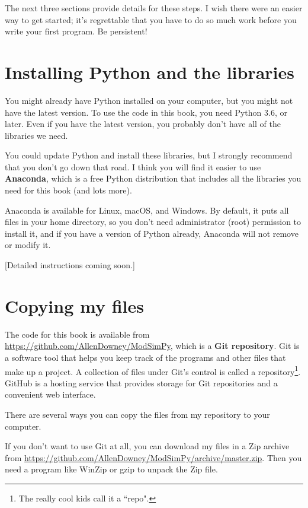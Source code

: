 \documentclass[12pt]{book}
\theoremstyle{exercise}
\begin{document}
The next three sections provide details for these steps.  I wish there were an easier way to get started; it's regrettable that you have to do so much work before you write your first program.  Be persistent!


\section{Installing Python and the libraries}

You might already have Python installed on your computer, but you might not have the latest version.  To use the code in this book, you need Python 3.6, or later.  Even if you have the latest version, you probably don't have all of the libraries we need.

You could update Python and install these libraries, but I strongly recommend that you don't go down that road.  I think you will find it easier to use {\bf Anaconda}, which is a free Python distribution that includes all the libraries you need for this book (and lots more).

Anaconda is available for Linux, macOS, and Windows.  By default, it puts all files in your home directory, so you don't need administrator (root) permission to install it, and if you have a version of Python already, Anaconda will not remove or modify it.

[Detailed instructions coming soon.]



\section{Copying my files}

The code for this book is available from
\url{https://github.com/AllenDowney/ModSimPy}, which is a {\bf Git repository}.  Git is a software tool that helps you keep track of the programs and other files that make up a project.  A collection of files under Git's control is called a repository\footnote{The really cool kids call it a ``repo".}.  GitHub is a hosting service that provides storage for Git repositories and a convenient web interface.

There are several ways you can copy the files from my repository to your computer.

If you don't want to use Git at all, you can download my files
in a Zip archive from \url{https://github.com/AllenDowney/ModSimPy/archive/master.zip}.  Then you need a program like WinZip or gzip to unpack the Zip file.
\end{document}
